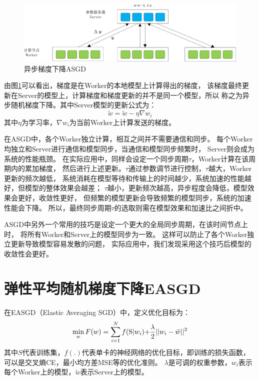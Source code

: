 \begin{figure}[htbp]
\centering
\includegraphics[width=1.0\textwidth]{figures/chapter5/asgd-crop}
\caption{异步梯度下降ASGD}
\label{fig:asgd}
\end{figure}

由图\ref{fig:asgd}可以看出，梯度是在Worker的本地模型上计算得出的梯度，
该梯度最终更新在Server的模型上，计算梯度和梯度更新的并不是同一个模型，所以
称之为异步随机梯度下降。其中Server模型的更新公式为：
\begin{equation}
{\tilde w} = {\tilde w} - \eta \nabla w_i
\end{equation}
其中$\eta$为学习率，$\nabla w_i$为当前Worker上计算发送的梯度。


在ASGD中，各个Worker独立计算，相互之间并不需要通信和同步。
每个Worker均独立和Server进行通信和模型同步，当通信和模型同步频繁时，
Server则会成为系统的性能瓶颈。
在实际应用中，同样会设定一个同步周期$\tau$，Worker计算在该周期内的累加梯度，
然后进行上述更新。$\tau$通过参数调节进行控制，$\tau$越大，Worker更新的频次越低，
系统消耗在模型等待和传输上的时间越少，系统加速的性能越好，但模型的整体效果会越差；
$\tau$越小，更新频次越高，异步程度会降低，模型效果会更好，收敛性更好，
但频繁的模型更新会导致频繁的模型同步，系统的加速性能会下降。
所以，最终同步周期$\tau$的选取则需在模型效果和加速比之间折中。

ASGD中另外一个常用的技巧是设定一个更大的全局同步周期，在该时间节点上时，
将所有Worker和Server上的模型同步为一致。
这样可以防止了各个Worker独立更新导致模型容易发散的问题，
实际应用中，我们发现采用这个技巧后模型的收敛性会更好。

\section{弹性平均随机梯度下降EASGD}

在EASGD（Elastic Averaging SGD）中，定义优化目标为：
\begin{equation}
\label{equation:easgd}
\mathop {\min }\limits_w F(w) = \sum\limits_{i = 1}^N {f({\rm{S|}}{w_i})} {\rm{ + }}\frac{\lambda }{2}{\rm{||}}{w_i} - \tilde w|{|^2}
\end{equation}
其中$S$代表训练集，$f(.)$代表单卡的神经网络的优化目标，即训练的损失函数，可以是交叉熵CE，最小均方差MSE等的优化准则。
$\lambda$是可调的权重参数，$w_i$表示每个Worker上的模型，$\tilde w $表示Server上的模型。

